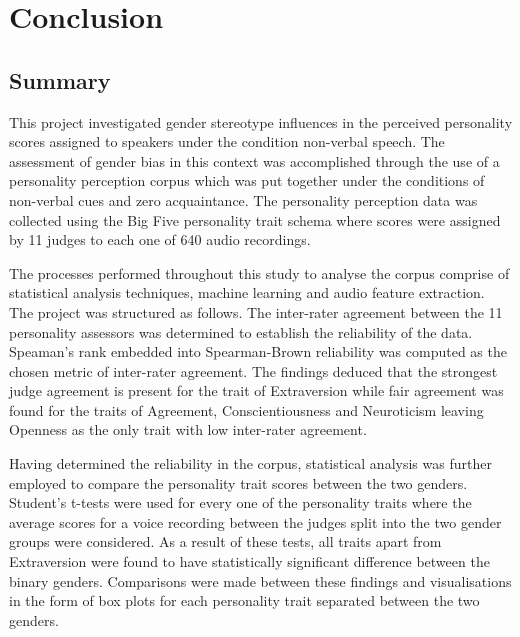 \documentclass{l4proj}
\begin{document}
\chapter{Conclusion}\label{chap:conclusion}

\section{Summary}
This project investigated gender stereotype influences in the perceived personality scores assigned to speakers under the condition non-verbal speech. The assessment of gender bias in this context was accomplished through the use of a personality perception corpus which was put together under the conditions of non-verbal cues and zero acquaintance. The personality perception data was collected using the Big Five personality trait schema where scores were assigned by 11 judges to each one of 640 audio recordings.

The processes performed throughout this study to analyse the corpus comprise of statistical analysis techniques, machine learning and audio feature extraction. 
The project was structured as follows. The inter-rater agreement between the 11 personality assessors was determined to establish the reliability of the data. Speaman’s rank embedded into Spearman-Brown reliability was computed as the chosen metric of inter-rater agreement. 
The findings deduced that the strongest judge agreement is present for the trait of Extraversion while fair agreement was found for the traits of Agreement, Conscientiousness and Neuroticism leaving Openness as the only trait with low inter-rater agreement. 

Having determined the reliability in the corpus, statistical analysis was further employed to compare the personality trait scores between the two genders. Student’s t-tests were used for every one of the personality traits where the average scores for a voice recording between the judges split into the two gender groups were considered. As a result of these tests, all traits apart from Extraversion were found to have statistically significant difference between the binary genders. 
Comparisons were made between these findings and visualisations in the form of box plots for each personality trait separated between the two genders. 
\end{document}
